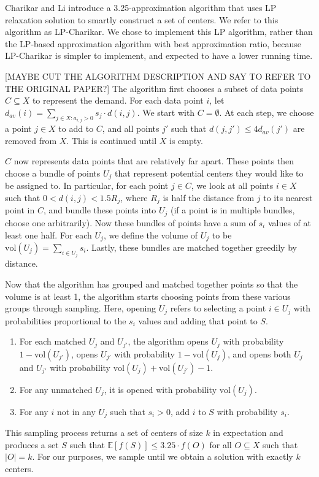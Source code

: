 \documentclass[conference, 10pt, final]{IEEEtran}
\begin{document}
Charikar and Li \cite{Charikar} introduce a 3.25-approximation algorithm that uses LP relaxation solution to smartly construct a set of centers. We refer to this algorithm as LP-Charikar. We chose to implement this LP algorithm, rather than the LP-based approximation algorithm with best approximation ratio, because LP-Charikar is simpler to implement, and expected to have a lower running time.  

[MAYBE CUT THE ALGORITHM DESCRIPTION AND SAY TO REFER TO THE ORIGINAL PAPER?]
The algorithm first chooses a subset of data points $C \subseteq X$ to represent the demand. For each data point $i$, let $d_{av}(i) = \sum_{j \in X : a_{i,j} > 0} s_j \cdot d(i,j)$. We start with $C = \emptyset$. At each step, we choose a point $j \in X$ to add to $C$, and all points $j'$ such that $d(j,j') \leq 4 d_{av}(j') $ are removed from $X$. This is continued until $X$ is empty. 

$C$ now represents data points that are relatively far apart. These points then choose a bundle of points $U_j$ that represent potential centers they would like to be assigned to. In particular, for each point $j \in C$, we look at all points $i \in X$ such that $0 < d(i,j) < 1.5 R_j$, where $R_j$ is half the distance from $j$ to its nearest point in $C$, and bundle these points into $U_j$ (if a point is in multiple bundles, choose one arbitrarily). Now these bundles of points have a sum of $s_i$ values of at least one half. For each $U_j$, we define the volume of $U_j$ to be $\mathrm{vol}(U_j) = \sum_{i \in U_j} s_i$. Lastly, these bundles are matched together greedily by distance. 

Now that the algorithm has grouped and matched together points so that the volume is at least 1, the algorithm starts choosing points from these various groups through sampling. Here, opening $U_j$ refers to selecting a point $i \in U_j$ with probabilities proportional to the $s_i$ values and adding that point to $S$. 
\begin{enumerate}[\IEEEsetlabelwidth{3)}]
\item For each matched $U_j$ and $U_{j'}$, the algorithm opens $U_j$ with probability $1-\mathrm{vol}(U_{j'})$, opens $U_{j'}$ with probability $1- \mathrm{vol}(U_j)$, and opens both $U_{j}$ and $U_{j'}$ with probability $\mathrm{vol}(U_j) + \mathrm{vol}(U_{j'}) -1$. 
\item For any unmatched $U_j$, it is opened with probability $\mathrm{vol}(U_j)$.
\item For any $i$ not in any $U_j$ such that $s_i > 0$, add $i$ to $S$ with probability $s_i$. 
\end{enumerate}
This sampling process returns a set of centers of size $k$  in expectation and produces a set $S$ such that $\mathbb{E}[f(S)] \leq 3.25 \cdot f(O)$ for all $O \subseteq X$ such that $|O| = k$. For our purposes, we sample until we obtain a solution with exactly $k$ centers. 
\end{document}

